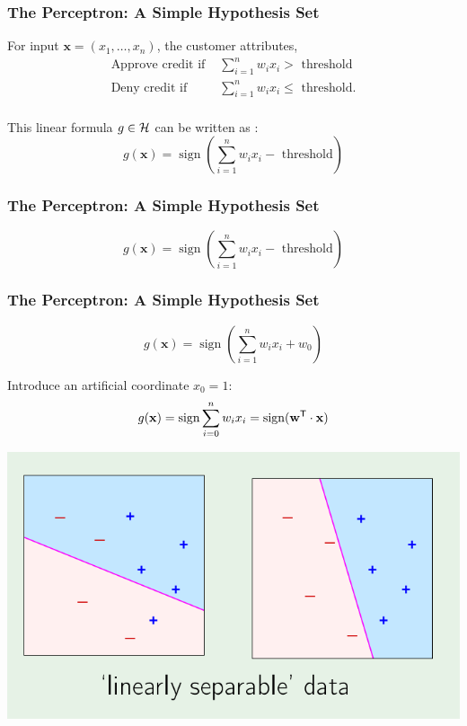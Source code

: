 \documentclass[xcolor=table]{beamer}
\newcommand{\vect}[1]{\ensuremath{\mathbf{#1}}}
\newcommand{\trans}[1]{\ensuremath{#1}^{\footnotesize{\textsf{T}}}}
\DeclareMathOperator{\sign}{sign}
\begin{document}
\begin{frame}[t]
\frametitle{The Perceptron: A Simple Hypothesis Set}
For input $\vect{x} = (x_1, \ldots, x_n)$, the customer attributes,
\begin{align*}
\text{Approve credit if } & \sum_{i = 1}^{n} w_i x_i >    \text{ threshold} \\
\text{Deny credit if }    & \sum_{i = 1}^{n} w_i x_i \leq \text{ threshold}. \\
\end{align*}

This linear formula $g \in \cal{H}$ can be written as :
\[
    g(\vect{x}) = \sign \left (\sum_{i=1}^{n} w_i x_i - \text{ threshold} \right )
\]
\end{frame}

\begin{frame}[t]
\frametitle{The Perceptron: A Simple Hypothesis Set}
\[
    g(\vect{x}) = \sign \left (\sum_{i=1}^{n} w_i x_i - \text{ threshold} \right )
\]
\end{frame}

\begin{frame}[t]
\frametitle{The Perceptron: A Simple Hypothesis Set}
\[
    g(\vect{x}) = \sign \left (\sum_{i=1}^{n} w_i x_i + w_0\right )
\]

\pause

Introduce an artificial coordinate $x_0 = 1$:
\[
     g(\vect{x}) = \sign \sum_{i=0}^{n} w_i x_i = \sign(\trans{\vect{w}} \cdot \vect{x})
\]

\pause

\begin{center}
    \includegraphics[scale=0.25]{linearly_separable_data.png}
\end{center}
\end{frame}
\end{document}
